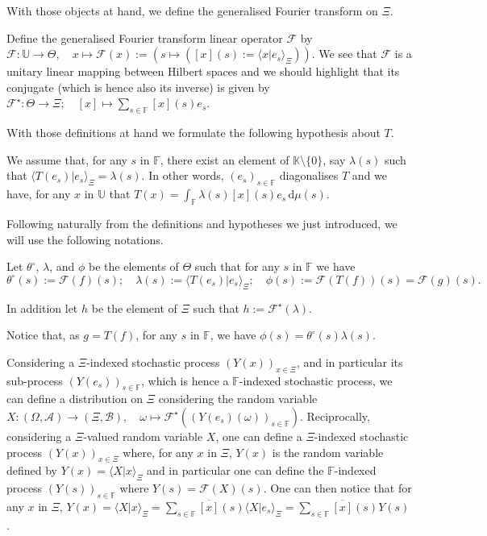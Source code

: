 With those objects at hand, we define the generalised Fourier transform on $\Xi$.

\begin{de}
Define the generalised Fourier transform linear operator
$\mathcal{F}$ by $\mathcal{F} : \mathds{U} \rightarrow \Theta, \quad x \mapsto \mathcal{F}(x) := (s \mapsto ([x](s) := \langle x \vert e_{s} \rangle_{\Xi}))$.
We see that $\mathcal{F}$ is a unitary linear mapping between Hilbert spaces and we should highlight that its conjugate (which is hence also its inverse) is given by
$\mathcal{F}^{\star} : \Theta \rightarrow \Xi; \quad [x] \mapsto \sum_{s \in \mathds{F}}[x](s) e_{s}$.
\assEnd
\end{de}

With those definitions at hand we formulate the following hypothesis about $T$.

\begin{as}\label{INTRO_DATA_DIAGONAL}
We assume that, for any $s$ in $\mathds{F}$, there exist an element of $\mathds{K} \setminus \{0\}$, say $\lambda(s)$ such that $\langle T(e_{s}) \vert e_{s} \rangle_{\Xi} = \lambda(s)$.
In other words, $(e_{s})_{s \in \mathds{F}}$ diagonalises $T$ and we have, for any $x$ in $\mathds{U}$ that $T(x) = \int_{\mathds{F}} \lambda(s) [x](s) e_{s} \, \text{d}\mu(s)$.
\assEnd
\end{as}

Following naturally from the definitions and hypotheses we just introduced, we will use the following notations.

\begin{de}
Let $\theta^{\circ}$, $\lambda$, and $\phi$ be the elements of $\Theta$ such that for any $s$ in $\mathds{F}$ we have
\[\theta^{\circ}(s) := \mathcal{F}(f)(s); \quad \lambda(s) := \langle T(e_{s}) \vert e_{s} \rangle_{\Xi}; \quad \phi(s) := \mathcal{F}(T(f))(s) = \mathcal{F}(g)(s).\]

In addition let $h$ be the element of $\Xi$ such that $h := \mathcal{F}^{\star}(\lambda)$.
\assEnd
\end{de}

Notice that, as $g = T(f)$, for any $s$ in $\mathds{F}$, we have $\phi(s) = \theta^{\circ}(s) \lambda(s)$.

Considering a $\Xi$-indexed stochastic process $(Y(x))_{x \in \Xi}$, and in particular its sub-process $(Y(e_{s}))_{s \in \mathds{F}}$, which is hence a $\mathds{F}$-indexed stochastic process, we can define a distribution on $\Xi$ considering the random variable $X: (\Omega, \mathcal{A}) \to (\Xi, \mathcal{B}), \quad \omega \mapsto \mathcal{F}^{\star}((Y(e_{s})(\omega))_{s \in \mathds{F}})$.
Reciprocally, considering a $\Xi$-valued random variable $X$, one can define a $\Xi$-indexed stochastic process $(Y(x))_{x \in \Xi}$ where, for any $x$ in $\Xi$, $Y(x)$ is the random variable defined by $Y(x) = \langle X \vert x \rangle_{\Xi}$ and in particular one can define the $\mathds{F}$-indexed process $(Y(s))_{s \in \mathds{F}}$ where $Y(s) = \mathcal{F}(X)(s)$.
One can then notice that for any $x$ in $\Xi$, $Y(x) = \langle X \vert x \rangle_{\Xi} = \sum_{s \in \mathds{F}} \overline{[x]}(s) \langle X \vert e_{s} \rangle_{\Xi} = \sum_{s \in \mathds{F}} \overline{[x]}(s) Y(s)$.

